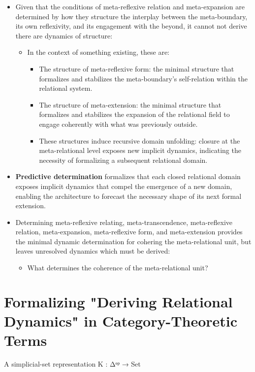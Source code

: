 \documentclass[11pt]{article}
\begin{document}
\begin{itemize}
\item Given that the conditions of meta-reflexive relation and meta-expansion are determined by how they structure the interplay between the meta-boundary, its own reflexivity, and its engagement with the beyond, it cannot not derive there are dynamics of structure:

\begin{itemize}
\item In the context of something existing, these are:

\begin{itemize}
\item The structure of meta-reflexive form: the minimal structure that formalizes and stabilizes the meta-boundary’s self-relation within the relational system.

\item The structure of meta-extension: the minimal structure that formalizes and stabilizes the expansion of the relational field to engage coherently with what was previously outside.
\item These structures induce recursive domain unfolding: closure at the meta-relational level exposes new implicit dynamics, indicating the necessity of formalizing a subsequent relational domain.
\end{itemize}
\end{itemize}
\item \textbf{\textbf{Predictive determination}} formalizes that each closed relational domain exposes implicit dynamics that compel the emergence of a new domain, enabling the architecture to forecast the necessary shape of its next formal extension.
\item Determining meta-reflexive relating, meta-transcendence, meta-reflexive relation, meta-expansion, meta-reflexive form, and meta-extension provides the minimal dynamic determination for cohering the meta-relational unit, but leaves unresolved dynamics which must be derived:
\begin{itemize}
\item What determines the coherence of the meta-relational unit?
\end{itemize}
\end{itemize}
\section*{Formalizing "Deriving Relational Dynamics" in Category-Theoretic Terms}
\label{sec:org023d4ca}
A simplicial-set representation K : Δᵒᵖ → Set
\end{document}
